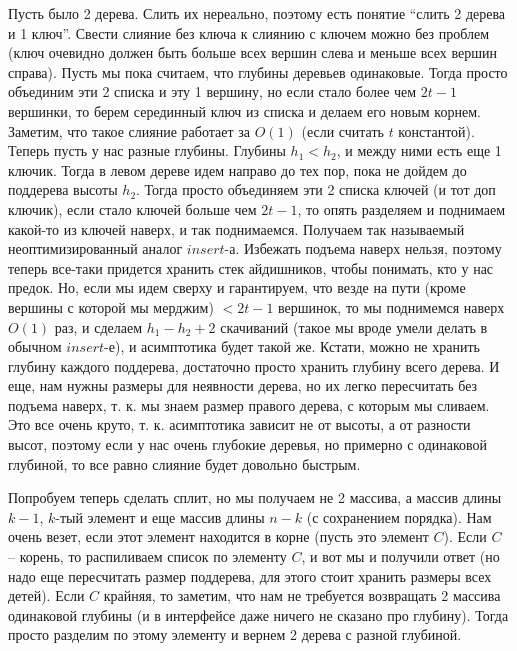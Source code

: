 Пусть было 2 дерева. Слить их нереально, поэтому есть понятие ``слить 2 дерева и 1 ключ''. Свести слияние без ключа к слиянию с ключем можно без проблем (ключ очевидно должен быть больше всех вершин слева и меньше всех вершин справа). Пусть мы пока считаем, что глубины деревьев одинаковые. Тогда просто объединим эти 2 списка и эту 1 вершину, но если стало более чем $2t-1$ вершинки, то берем серединный ключ из списка и делаем его новым корнем. Заметим, что такое слияние работает за $O(1)$ (если считать $t$ константой). Теперь пусть у нас разные глубины. Глубины $h_1 < h_2$, и между ними есть еще 1 ключик. Тогда в левом дереве идем направо до тех пор, пока не дойдем до поддерева высоты $h_2$. Тогда просто объединяем эти 2 списка ключей (и тот доп ключик), если стало ключей больше чем $2t-1$, то опять разделяем и поднимаем какой-то из ключей наверх, и так поднимаемся. Получаем так называемый неоптимизированный аналог $insert$-а. Избежать подъема наверх нельзя, поэтому теперь все-таки придется хранить стек айдишников, чтобы понимать, кто у нас предок. Но, если мы идем сверху и гарантируем, что везде на пути (кроме вершины с которой мы мерджим) $< 2t - 1$ вершинок, то мы поднимемся наверх $O(1)$ раз, и сделаем $h_1 - h_2 + 2$ скачиваний (такое мы вроде умели делать в обычном $insert$-е), и асимптотика будет такой же. Кстати, можно не хранить глубину каждого поддерева, достаточно просто хранить глубину всего дерева. И еще, нам нужны размеры для неявности дерева, но их легко пересчитать без подъема наверх, т. к. мы знаем размер правого дерева, с которым мы сливаем. Это все очень круто, т. к. асимптотика зависит не от высоты, а от разности высот, поэтому если у нас очень глубокие деревья, но примерно с одинаковой глубиной, то все равно слияние будет довольно быстрым.

Попробуем теперь сделать сплит, но мы получаем не 2 массива, а массив длины $k-1$, $k$-тый элемент и еще массив длины $n - k$ (с сохранением порядка). Нам очень везет, если этот элемент находится в корне (пусть это элемент $C$). Если $C$ -- корень, то распиливаем список по элементу $C$, и вот мы и получили ответ (но надо еще пересчитать размер поддерева, для этого стоит хранить размеры всех детей). Если $C$ крайняя, то заметим, что нам не требуется возвращать 2 массива одинаковой глубины (и в интерфейсе даже ничего не сказано про глубину). Тогда просто разделим по этому элементу и вернем 2 дерева с разной глубиной. 

